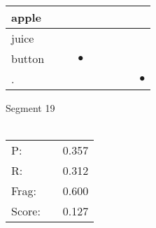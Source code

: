 \documentclass[landscape]{article}
\newcommand{\ssp}{\hspace{2pt}}
\newcommand{\mex}{\cellcolor{g}$\bullet$}
\begin{document}
\begin{tabular}{|l|p{10pt}|p{10pt}|p{10pt}|p{10pt}|p{10pt}|p{10pt}|p{10pt}|p{10pt}|}
\hline
\ssp apple \ssp&\hspace{2pt}&\hspace{2pt}&\hspace{2pt}&\hspace{2pt}&\hspace{2pt}&\hspace{2pt}&\hspace{2pt}&\hspace{2pt}\\
\hline
\ssp juice \ssp&\hspace{2pt}&\hspace{2pt}&\hspace{2pt}&\hspace{2pt}&\hspace{2pt}&\hspace{2pt}&\hspace{2pt}&\hspace{2pt}\\
\hline
\ssp \cellcolor{ref2}button \ssp&\hspace{2pt}&\hspace{2pt}&\hspace{2pt}\mex&\hspace{2pt}&\hspace{2pt}&\hspace{2pt}&\hspace{2pt}&\hspace{2pt}\\
\hline
\ssp \cellcolor{ref7}. \ssp&\hspace{2pt}&\hspace{2pt}&\hspace{2pt}&\hspace{2pt}&\hspace{2pt}&\hspace{2pt}&\hspace{2pt}&\hspace{2pt}\mex\\
\hline
\end{tabular}

\vspace{6pt}
\noindent Segment 19\\\\
\noindent\begin{tabular}{lm{12pt}r}
\hline
P:&&0.357\\
R:&&0.312\\
Frag:&&0.600\\
Score:&&0.127\\
\end{tabular}
\end{document}
